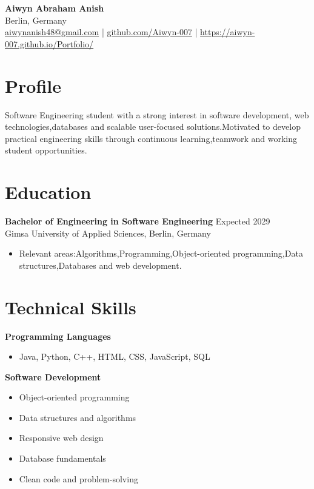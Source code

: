 \documentclass[11pt,a4paper]{article}
\begin{document}
\begin{center}
    {\LARGE \textbf{Aiwyn Abraham Anish}} \\[6pt]
    Berlin, Germany \\[3pt]
    \href{mailto:aiwynanish48@gmail.com}{aiwynanish48@gmail.com}
    \quad | \quad
    \href{https://github.com/YOUR-GITHUB-USERNAME}
    {github.com/Aiwyn-007}
    \quad | \quad
    \href{https://YOUR-GITHUB-USERNAME.github.io/YOUR-REPOSITORY-NAME/}
    {https://aiwyn-007.github.io/Portfolio/}
\end{center}

\section*{Profile}

Software Engineering student with a strong interest in software development,
web technologies,databases and scalable user-focused solutions.Motivated to
develop practical engineering skills through continuous learning,teamwork and
working student opportunities.

\section*{Education}

\textbf{Bachelor of Engineering in Software Engineering} \hfill Expected 2029 \\
Gimsa University of Applied Sciences, Berlin, Germany

\begin{itemize}
    \item Relevant areas:Algorithms,Programming,Object-oriented programming,Data
    structures,Databases and web development.
\end{itemize}

\section*{Technical Skills}

\textbf{Programming Languages}
\begin{itemize}
    \item Java, Python, C++, HTML, CSS, JavaScript, SQL
\end{itemize}

\textbf{Software Development}
\begin{itemize}
    \item Object-oriented programming
    \item Data structures and algorithms
    \item Responsive web design
    \item Database fundamentals
    \item Clean code and problem-solving
\end{itemize}
\end{document}
